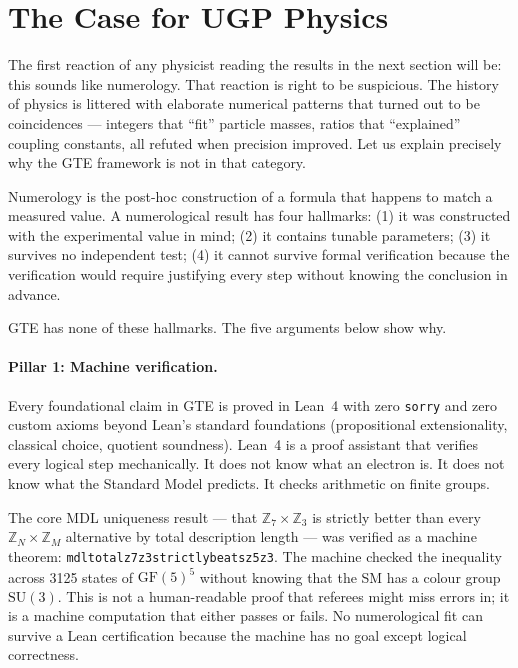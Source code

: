 \documentclass[11pt,openany]{book}
\theoremstyle{remark}
\newcommand{\lean}[1]{%
  \penalty-100
  \begingroup\def\_{\textunderscore\allowbreak}\texttt{#1}\endgroup}
\begin{document}
\section{The Case for UGP Physics}
\label{sec:case}

The first reaction of any physicist reading the results in the next section will be:
this sounds like numerology.
That reaction is right to be suspicious.
The history of physics is littered with elaborate numerical patterns that turned out to
be coincidences --- integers that ``fit'' particle masses, ratios that ``explained''
coupling constants, all refuted when precision improved.
Let us explain precisely why the GTE framework is not in that category.

\begin{tcolorbox}[colback=yellow!5,colframe=yellow!60!black,title={Why This Is Not Numerology},breakable]
Numerology is the post-hoc construction of a formula that happens to match a measured
value.
A numerological result has four hallmarks:
(1) it was constructed with the experimental value in mind;
(2) it contains tunable parameters;
(3) it survives no independent test;
(4) it cannot survive formal verification because the verification would require
justifying every step without knowing the conclusion in advance.

GTE has none of these hallmarks.
The five arguments below show why.
\end{tcolorbox}

\paragraph{Pillar 1: Machine verification.}
Every foundational claim in GTE is proved in Lean~4 with zero \lean{sorry} and zero
custom axioms beyond Lean's standard foundations (propositional extensionality,
classical choice, quotient soundness).
Lean~4 is a proof assistant that verifies every logical step mechanically.
It does not know what an electron is.
It does not know what the Standard Model predicts.
It checks arithmetic on finite groups.

The core MDL uniqueness result --- that $\mathbb{Z}_7\times\mathbb{Z}_3$ is strictly
better than every $\mathbb{Z}_N\times\mathbb{Z}_M$ alternative by total description
length --- was verified as a machine theorem: \lean{mdl\_total\_z7z3\_strictly\_beats\_z5z3}.
The machine checked the inequality across 3125 states of $\mathrm{GF}(5)^5$ without
knowing that the SM has a colour group $\mathrm{SU}(3)$.
This is not a human-readable proof that referees might miss errors in; it is a
machine computation that either passes or fails.
No numerological fit can survive a Lean certification because the machine has no goal
except logical correctness.
\end{document}
